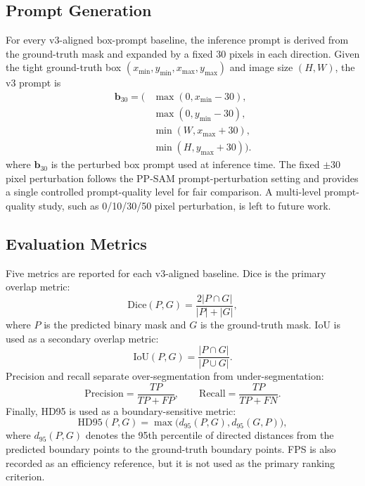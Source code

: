 \subsection{Prompt Generation}
\label{sec:prompt-generation}

For every v3-aligned box-prompt baseline, the inference prompt is derived from the ground-truth mask and expanded by a fixed 30 pixels in each direction. Given the tight ground-truth box $(x_{\min},y_{\min},x_{\max},y_{\max})$ and image size $(H,W)$, the v3 prompt is
\begin{equation}
\begin{aligned}
  \mathbf{b}_{30} = \bigl(&
  \max(0, x_{\min}-30),\\
  &\max(0, y_{\min}-30),\\
  &\min(W, x_{\max}+30),\\
  &\min(H, y_{\max}+30)
  \bigr).
\end{aligned}
\label{eq:box-perturbation}
\end{equation}
\noindent where $\mathbf{b}_{30}$ is the perturbed box prompt used at inference time. The fixed $\pm30$ pixel perturbation follows the PP-SAM prompt-perturbation setting and provides a single controlled prompt-quality level for fair comparison. A multi-level prompt-quality study, such as 0/10/30/50 pixel perturbation, is left to future work.

\subsection{Evaluation Metrics}
\label{sec:evaluation-metrics}

Five metrics are reported for each v3-aligned baseline. Dice is the primary overlap metric:
\begin{equation}
  \mathrm{Dice}(P,G) = \frac{2|P\cap G|}{|P| + |G|},
  \label{eq:dice}
\end{equation}
where $P$ is the predicted binary mask and $G$ is the ground-truth mask. IoU is used as a secondary overlap metric:
\begin{equation}
  \mathrm{IoU}(P,G) = \frac{|P\cap G|}{|P\cup G|}.
  \label{eq:iou}
\end{equation}
Precision and recall separate over-segmentation from under-segmentation:
\begin{equation}
  \mathrm{Precision}=\frac{TP}{TP+FP},\qquad
  \mathrm{Recall}=\frac{TP}{TP+FN}.
  \label{eq:precision-recall}
\end{equation}
Finally, HD95 is used as a boundary-sensitive metric:
\begin{equation}
  \mathrm{HD95}(P,G) = \max\bigl(d_{95}(P,G), d_{95}(G,P)\bigr),
  \label{eq:hd95}
\end{equation}
where $d_{95}(P,G)$ denotes the 95th percentile of directed distances from the predicted boundary points to the ground-truth boundary points. FPS is also recorded as an efficiency reference, but it is not used as the primary ranking criterion.

